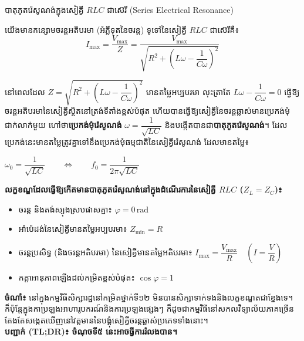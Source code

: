 \begin{formulabox}[breakable=false, top=6pt, bottom=6pt, left=10pt, right=10pt]{បាតុភូតរ៉េសូណង់ក្នុងសៀគ្វី $RLC$ ជាស៊េរី ({\englishfont Series Electrical Resonance})}
	\raggedright
	យើងមានកន្សោមចរន្តអតិបរមា (អំភ្លីទុតនៃចរន្ត) ទូទៅនៃសៀគ្វី $RLC$ ជាស៊េរីគឺ៖
	\[ I_{\max} = \dfrac{V_{\max}}{Z} = \dfrac{V_{\max}}{\sqrt{R^2 + \left(L\omega - \dfrac{1}{C\omega}\right)^2}} \]
	\par\vspace{1pt}
	នៅពេលដែល $Z = \sqrt{R^2 + \left(L\omega - \dfrac{1}{C\omega}\right)^2}$ មានតម្លៃអប្បបរមា លុះត្រាតែ $L\omega - \dfrac{1}{C\omega} = 0$ ធ្វើឱ្យចរន្តអតិបរមានៃសៀគ្វីស្ថិតនៅត្រង់ទីតាំងខ្ពស់បំផុត ហើយបានធ្វើឱ្យសៀគ្វីនៃចរន្តឆ្លាស់មានប្រេកង់មុំជាក់លាក់មួយ ហៅថា\textbf{ប្រេកង់មុំរ៉េសូណង់} $\omega = \dfrac{1}{\sqrt{LC}}$ និងបង្កើតបានជា\textbf{បាតុភូតរ៉េសូណង់}។ ដែលប្រេកង់នេះមានតម្លៃត្រូវគ្នាទៅនឹងប្រេកង់មុំធម្មជាតិនៃសៀគ្វីរ៉េសូណង់ ដែលមានតម្លៃ៖
	\begin{center}
		$\boxed{\omega_0 = \dfrac{1}{\sqrt{LC}}} \qquad \iff \qquad \boxed{f_0 = \dfrac{1}{2\pi\sqrt{LC}}}$
	\end{center}
	\par\vspace{1pt}
	\noindent\textbf{\textcolor{brownheader}{លក្ខខណ្ឌដែលធ្វើឱ្យកើតមានបាតុភូតរ៉េសូណង់នៅក្នុងដំណើរការនៃសៀគ្វី $RLC$ ($Z_L = Z_C$)៖}}
	\begin{itemize}[itemsep=1.5pt, topsep=1.5pt, parsep=0pt, leftmargin=1.4em]
		\item ចរន្ត និងតង់ស្យុងស្របផាសគ្នា៖ $\varphi = 0\,\text{rad}$
		\item អាំប៉េដង់នៃសៀគ្វីមានតម្លៃអប្បបរមា៖ $Z_{\min} = R$
		\item ចរន្តប្រសិទ្ធ (និងចរន្តអតិបរមា) នៃសៀគ្វីមានតម្លៃអតិបរមា៖ $I_{\max} = \dfrac{V_{\max}}{R} \quad \left(I = \dfrac{V}{R}\right)$
		\item កត្តាអានុភាពឡើងដល់កម្រិតខ្ពស់បំផុត៖ $\cos\varphi = 1$
	\end{itemize}
\end{formulabox}

\vspace{0.4em}


\vspace{0.2em}
\noindent
\begin{tcolorbox}[
	enhanced,
	colback=boxbg,
	colframe=bacpink!70,
	boxrule=0.8pt,
	sharp corners,
	borderline west={3pt}{0pt}{bacpink},
	width=\linewidth,
	halign=left,
	left=12pt, right=12pt, top=6pt, bottom=6pt,
	fontupper=\small
]
	\textbf{ចំណាំ៖} នៅក្នុងកម្មវិធីសិក្សារដ្ឋនៅកម្រិតថ្នាក់ទី១២ មិនបានសិក្សាទាក់ទងនិងលក្ខខណ្ឌតជាខ្នែងទេ។
	ក៏ប៉ុន្តែក្នុងកាប្រឡងអាហារូបករណ៍និងការប្រឡងផ្សេងៗ ក៏ដូចជាកម្មវិធីនៅសកលវិទ្យាល័យភាគច្រើនតែងតែសង្កេតឃើញនៅវត្តមាននៃបង្គុំសៀគ្វីចរន្តឆ្លាស់ប្រភេទទាំងនោះ។\\
	\textbf{បញ្ជាក់ (TL;DR)៖ ចំណុចទី៥ នេះអាចធ្វីការរំលងបាន។}
\end{tcolorbox}

